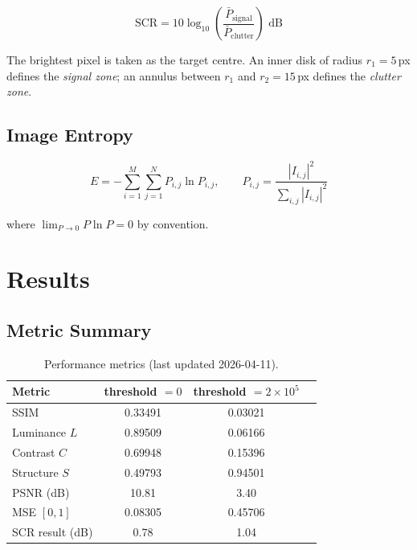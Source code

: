 \documentclass[12pt]{article}
\begin{document}
\begin{equation}
    \text{SCR} = 10\log_{10}\!\left(\frac{\bar{P}_{\text{signal}}}{\bar{P}_{\text{clutter}}}\right) \text{ dB}
\end{equation}

The brightest pixel is taken as the target centre. An inner disk of radius
$r_1 = 5$\,px defines the \emph{signal zone}; an annulus between $r_1$ and
$r_2 = 15$\,px defines the \emph{clutter zone}.

\subsection{Image Entropy}

\begin{equation}
    E = -\sum_{i=1}^{M}\sum_{j=1}^{N} P_{i,j}\ln P_{i,j},
    \qquad P_{i,j} = \frac{|I_{i,j}|^2}{\displaystyle\sum_{i,j}|I_{i,j}|^2}
\end{equation}

\noindent where $\lim_{P\to 0} P\ln P = 0$ by convention.

\section{Results}

\subsection{Metric Summary}

\begin{table}[H]
    \centering
    \caption{Performance metrics (last updated 2026-04-11).}
    \begin{tabular}{lccc}
        \toprule
        Metric & threshold $= 0$ & threshold $= 2\times10^5$ \\
        \midrule
        SSIM            & 0.33491 & 0.03021 \\
        Luminance $L$   & 0.89509 & 0.06166 \\
        Contrast $C$    & 0.69948 & 0.15396 \\
        Structure $S$   & 0.49793 & 0.94501 \\
        PSNR (dB)       & 10.81   & 3.40    \\
        MSE $[0,1]$     & 0.08305 & 0.45706 \\
        SCR result (dB) & 0.78    & 1.04    \\
        \bottomrule
    \end{tabular}
\end{table}
\end{document}
